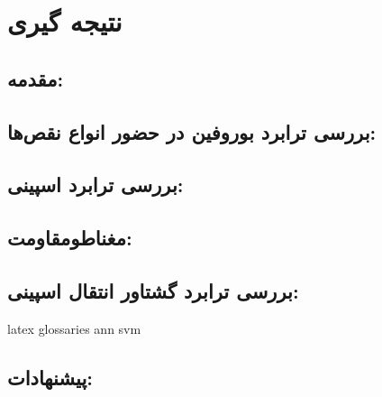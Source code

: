 \chapter{نتیجه گیری}

\clearpage
\section{مقدمه:}
\section{بررسی ترابرد بوروفین در حضور انواع نقص‌ها:}

\section{بررسی ترابرد اسپینی:}

\section{مغناطومقاومت:}

\section{بررسی ترابرد گشتاور انتقال اسپینی:}

\gls{latex}
\gls{glossaries}
\gls{ann}
\gls{svm}

\section{پیشنهادات:}
